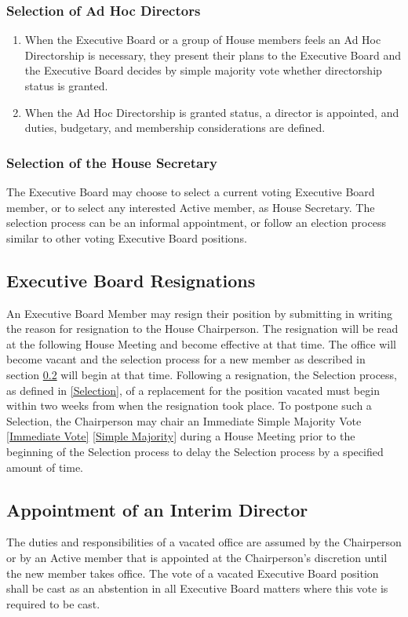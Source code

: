 \documentclass{article}
\newcommand{\asection}[1]{\subsection{#1} \label{#1}}
\newcommand{\asubsection}[1]{\subsubsection{#1} \label{#1}}
\begin{document}
\asubsection{Selection of Ad Hoc Directors}
\begin{enumerate}
	\item When the Executive Board or a group of House members feels an Ad Hoc Directorship is necessary, they present their plans to the Executive Board and the Executive Board decides by simple majority vote whether directorship status is granted.
	\item When the Ad Hoc Directorship is granted status, a director is appointed, and duties, budgetary, and membership considerations are defined.
\end{enumerate}
\asubsection{Selection of the House Secretary}
The Executive Board may choose to select a current voting Executive Board member, or to select any interested Active member, as House Secretary.
The selection process can be an informal appointment, or follow an election process similar to other voting Executive Board positions.

\asection{Executive Board Resignations}
An Executive Board Member may resign their position by submitting in writing the reason for resignation to the House Chairperson.
The resignation will be read at the following House Meeting and become effective at that time.
The office will become vacant and the selection process for a new member as described in section \ref{Appointment of an Interim Director} will begin at that time.
Following a resignation, the Selection process, as defined in \ref{Selection}, of a replacement for the position vacated must begin within two weeks from when the resignation took place.
To postpone such a Selection, the Chairperson may chair an Immediate Simple Majority Vote \ref{Immediate Vote} \ref{Simple Majority} during a House Meeting prior to the beginning of the Selection process to delay the Selection process by a specified amount of time.

\asection{Appointment of an Interim Director}
The duties and responsibilities of a vacated office are assumed by the Chairperson or by an Active member that is appointed at the Chairperson's discretion until the new member takes office.
The vote of a vacated Executive Board position shall be cast as an abstention in all Executive Board matters where this vote is required to be cast.
\end{document}

